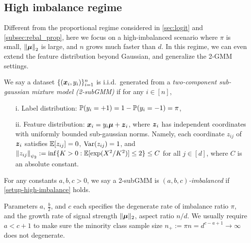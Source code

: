 

































\subsection{High imbalance regime}\label{subsec:high-imb}

Different from the proportional regime considered in \cref{sec:logit} and \ref{subsec:rebal_prop}, here we focus on a high-imbalanced scenario where $\pi$ is small, $\norm{\bmu}_2$ is large, and $n$ grows much faster than $d$. In this regime, we can even extend the feature distribution beyond Gaussian, and generalize the 2-GMM settings.

\begin{defn}
We say a dataset $\{(\xx_i, y_i)\}_{i = 1}^n$ is i.i.d.~generated from a \emph{two-component sub-gaussian mixture model (2-subGMM)} if for any $i \in [n]$,
\begin{enumerate}
    \item[i.] Label distribution: $\P(y_i = +1) = 1 - \P(y_i = -1) = \pi$, 
    \item[ii.] Feature distribution: $\xx_i = y_i \bmu + \zz_i$, where $\zz_i$ has independent coordinates with uniformly bounded sub-gaussian norms. Namely, each coordinate $z_{ij}$ of $\zz_i$ satisfies $\E[z_{ij}] = 0$, $\var(z_{ij}) = 1$, and $\norm{z_{ij}}_{\psi_2} := \inf \{ K > 0: \E[\exp(X^2/K^2)] \le 2 \} \le C$ for all $j \in [d]$, where $C$ is an absolute constant.
\end{enumerate}
For any constants $a,b,c >0$, we say a 2-subGMM is \emph{$(a,b,c)$-imbalanced} if \cref{setup-high-imbalance} holds.
\end{defn}
\begin{rem}
    Parameters $a$, $\frac{b}{2}$, and $c$ each specifies the degenerate rate of imbalance ratio $\pi$, and the growth rate of signal strength $\| \bmu \|_2$, aspect ratio $n/d$. We usually require $a < c + 1$ to make sure the minority class sample size $n_+ := \pi n = d^{c - a + 1} \to \infty$ does not degenerate.
\end{rem}

